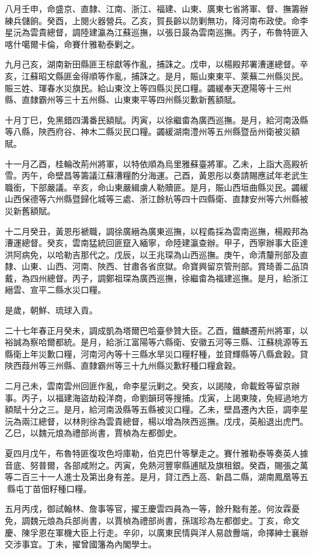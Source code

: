 \begin{pinyinscope}
八月壬申，命盛京、直隸、江南、浙江、福建、山東、廣東七省將軍、督、撫籌辦練兵儲餉。癸酉，上閱火器營兵。乙亥，賀長齡以防剿無功，降河南布政使。命李星沅為雲貴總督，調陸建瀛為江蘇巡撫，以張日晸為雲南巡撫。丙子，布魯特匪入喀什噶爾卡倫，命賽什雅勒泰剿之。

九月己亥，湖南新田縣匪王棕獻等作亂，捕誅之。戊申，以楊殿邦署漕運總督。辛亥，江蘇昭文縣匪金得順等作亂，捕誅之。是月，賑山東東平、萊蕪二州縣災民。賑三姓、琿春水災旗民。給山東汶上等四縣災民口糧。蠲緩奉天遼陽等十三州縣、直隸霸州等三十五州縣、山東東平等四州縣災歉新舊額賦。

十月丁巳，免黑錯四溝番民額賦。丙寅，以徐繼畬為廣西巡撫。是月，給河南汲縣等八縣，陜西府谷、神木二縣災民口糧。蠲緩湖南澧州等五州縣暨岳州衛被災額賦。

十一月乙酉，桂輪改荊州將軍，以特依順為烏里雅蘇臺將軍。乙未，上詣大高殿祈雪。丙午，命壁昌等籌議江蘇漕糧酌分海運。己酉，黃恩彤以奏請賜應試年老武生職銜，下部嚴議。辛亥，命山東嚴緝虜人勒贖匪。是月，賑山西垣曲縣災民。蠲緩山西保德等六州縣暨歸化城等三處、浙江餘杭等四十四縣衛、直隸安州等六州縣被災新舊額賦。

十二月癸丑，黃恩彤褫職，調徐廣縉為廣東巡撫，以程矞採為雲南巡撫，楊殿邦為漕運總督。癸亥，雲南猛統回匪竄入緬寧，命陸建瀛查辦。甲子，西寧辦事大臣達洪阿病免，以哈勒吉那代之。戊辰，以王兆琛為山西巡撫。庚午，命清釐刑部及直隸、山東、山西、河南、陜西、甘肅各省庶獄。命寶興留京管刑部。賞琦善二品頂戴，為四州總督。丙子，調鄭祖琛為廣西巡撫，徐繼畬為福建巡撫。是月，給浙江縉雲、宣平二縣水災口糧。

是歲，朝鮮、琉球入貢。

二十七年春正月癸未，調成凱為塔爾巴哈臺參贊大臣。乙酉，鐵麟遷荊州將軍，以裕誠為察哈爾都統。是月，給浙江富陽等六縣衛、安徽五河等三縣、江蘇桃源等五縣衛上年災歉口糧，河南河內等十三縣水旱災口糧籽種，並貸輝縣等八縣倉穀。貸陜西葭州等三州縣、直隸霸州等三十九州縣災歉籽種口糧倉穀。

二月己未，雲南雲州回匪作亂，命李星沅剿之。癸亥，以謁陵，命載銓等留京辦事。丙子，以福建海盜劫殺洋商，命劉韻珂等搜捕。戊寅，上謁東陵，免經過地方額賦十分之三。是月，給河南汲縣等五縣被災口糧。乙未，壁昌遷內大臣，調李星沅為兩江總督，以林則徐為雲貴總督，楊以增為陜西巡撫。戊戌，英船退出虎門。乙巳，以魏元烺為禮部尚書，賈楨為左都御史。

夏四月戊午，布魯特匪復攻色埒庫勒，伯克巴什等擊走之。賽什雅勒泰等奏英人據音底、努普爾，各部咸附之。丙寅，免熱河豐寧縣逋賦及旗租銀。癸酉，賜張之萬等二百三十一人進士及第出身有差。是月，貸江西上高、新昌二縣，湖南鳳凰等五縣屯丁苗佃籽種口糧。

五月丙戌，御試翰林、詹事等官，擢王慶雲四員為一等，餘升黜有差。何汝霖憂免，調魏元烺為兵部尚書，以賈楨為禮部尚書，孫瑞珍為左都御史。丁亥，命文慶、陳孚恩在軍機大臣上行走。辛卯，以廣東民情與洋人易啟釁端，命擇紳士襄辦交涉事宜。丁未，擢曾國籓為內閣學士。


\end{pinyinscope}
